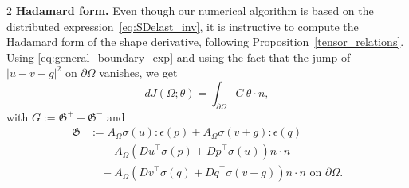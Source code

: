 \documentclass[a4paper, oneside]{article}
\newcommand{\Om}{\Omega}
\newcommand{\rood}[1]{\textcolor{mydarkgreen}{#1}}
\begin{document}
\begin{multicols}{2}
\textbf{Hadamard form.} Even though our numerical algorithm is based on the distributed expression~\eqref{eq:SDelast_inv}, it is instructive to compute the Hadamard form of the shape derivative, following Proposition~\ref{tensor_relations}.
Using \eqref{eq:general_boundary_exp} and using the fact that the jump of $|u-v-g|^2$ on $\partial\Om$ vanishes, we get
\begin{equation}
	dJ(\Omega;\theta) = \int_{\partial \Omega} G\, \theta\cdot n,
	\end{equation}
	with
	$G :=  \mathfrak{G}^+- \mathfrak{G}^-$ and 
\begin{align*}
	\mathfrak{G} & := A_{\Omega}\sigma(u):\epsilon(p) + A_{\Omega}\sigma(v+g):\epsilon(q)\\
			  & \quad - A_{\Omega} \left({Du}^{\top}\sigma(p) + {Dp}^{\top}\sigma(u)\right)n\cdot n\\
			  & \quad - A_{\Omega} \left({Dv}^{\top}\sigma(q) + {Dq}^{\top}\sigma(v+g)\right)n\cdot n \text{ on }\partial\Om.
\end{align*}





\end{multicols}
\end{document}
